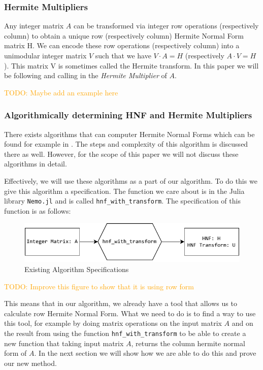 \documentclass[oneside, a4paper, onecolumn, 11pt]{article}
\newcommand{\todo}[1]{
    \begin{mdframed}
        \textcolor{orange}{
        TODO: #1
        }
    \end{mdframed}
}
\begin{document}
\subsubsection{Hermite Multipliers}

Any integer matrix \(A\) can be transformed via integer row operations (respectively column) to obtain a unique row (respectively column) Hermite Normal Form matrix H. We can encode these row operations (respectively column) into a unimodular integer matrix \(V\) such that we have \(V \cdot A = H\) (respectively \(A \cdot V = H\)). This matrix V is sometimes called the Hermite transform. In this paper we will be following \cite{Hubert2013} and calling in the \textit{Hermite Multiplier} of \(A\).

\todo{Maybe add an example here}

\subsubsection{Algorithmically determining HNF and Hermite Multipliers}

There exists algorithms that can computer Hermite Normal Forms which can be found for example in \cite{cohen2013course}. The steps and complexity of this algorithm is discussed there as well. However, for the scope of this paper we will not discuss these algorithms in detail.

Effectively, we will use these algorithms as a part of our algorithm. To do this we give this algorithm a specification. The function we care about is in the Julia library \texttt{Nemo.jl} and is called \texttt{hnf\_with\_transform}. The specification of this function is as follows:
\begin{figure}[H]
    \centering
    \includegraphics{images/diagram1.pdf}
    \caption{Existing Algorithm Specifications}
    \label{fig:existingalgo}
\end{figure}
\todo{Improve this figure to show that it is using row form}

This means that in our algorithm, we already have a tool that allows us to calculate row Hermite Normal Form. What we need to do is to find a way to use this tool, for example by doing matrix operations on the input matrix \(A\) and on the result from using the function \texttt{hnf\_with\_transform} to be able to create a new function that taking input matrix \(A\), returns the column hermite normal form of \(A\). In the next section we will show how we are able to do this and prove our new method.
\end{document}
